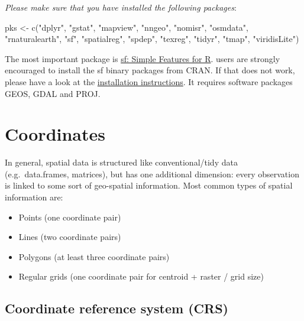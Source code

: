 \documentclass[
  letterpaper,
  DIV=11,
  numbers=noendperiod]{scrreprt}
\newenvironment{Shaded}{\begin{snugshade}}{\end{snugshade}}
\newcommand{\FunctionTok}[1]{\textcolor[rgb]{0.28,0.35,0.67}{#1}}
\newcommand{\NormalTok}[1]{\textcolor[rgb]{0.00,0.23,0.31}{#1}}
\newcommand{\OtherTok}[1]{\textcolor[rgb]{0.00,0.23,0.31}{#1}}
\newcommand{\StringTok}[1]{\textcolor[rgb]{0.13,0.47,0.30}{#1}}
\begin{document}
\emph{Please make sure that you have installed the following packages}:

\begin{Shaded}
\begin{Highlighting}[]
\NormalTok{pks }\OtherTok{\textless{}{-}} \FunctionTok{c}\NormalTok{(}\StringTok{"dplyr"}\NormalTok{,}
\StringTok{"gstat"}\NormalTok{,}
\StringTok{"mapview"}\NormalTok{,}
\StringTok{"nngeo"}\NormalTok{,}
\StringTok{"nomisr"}\NormalTok{,}
\StringTok{"osmdata"}\NormalTok{,}
\StringTok{"rnaturalearth"}\NormalTok{,}
\StringTok{"sf"}\NormalTok{,}
\StringTok{"spatialreg"}\NormalTok{,}
\StringTok{"spdep"}\NormalTok{,}
\StringTok{"texreg"}\NormalTok{,}
\StringTok{"tidyr"}\NormalTok{,}
\StringTok{"tmap"}\NormalTok{,}
\StringTok{"viridisLite"}\NormalTok{)}
\end{Highlighting}
\end{Shaded}

The most important package is \href{https://r-spatial.github.io/sf/}{sf:
Simple Features for R}. users are strongly encouraged to install the sf
binary packages from CRAN. If that does not work, please have a look at
the \href{https://r-spatial.github.io/sf/}{installation instructions}.
It requires software packages GEOS, GDAL and PROJ.

\hypertarget{coordinates}{%
\section{Coordinates}\label{coordinates}}

In general, spatial data is structured like conventional/tidy data
(e.g.~data.frames, matrices), but has one additional dimension: every
observation is linked to some sort of geo-spatial information. Most
common types of spatial information are:

\begin{itemize}
\item
  Points (one coordinate pair)
\item
  Lines (two coordinate pairs)
\item
  Polygons (at least three coordinate pairs)
\item
  Regular grids (one coordinate pair for centroid + raster / grid size)
\end{itemize}

\hypertarget{coordinate-reference-system-crs}{%
\subsection{Coordinate reference system
(CRS)}\label{coordinate-reference-system-crs}}
\end{document}

